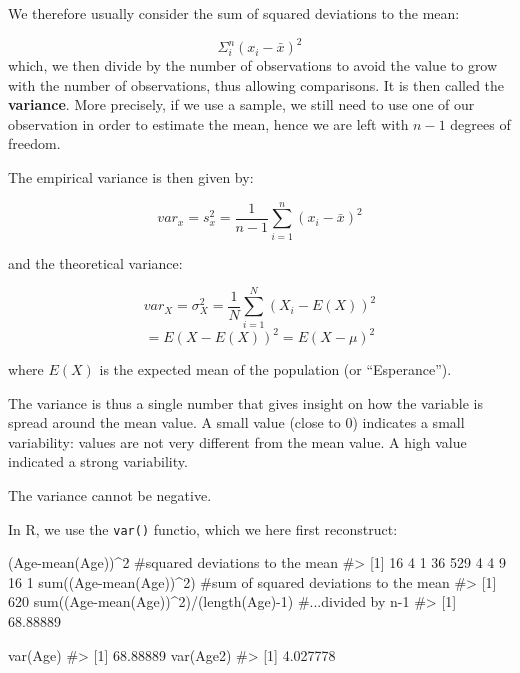 \documentclass[
  letterpaper,
  DIV=11,
  numbers=noendperiod]{scrreprt}
\newenvironment{Shaded}{\begin{snugshade}}{\end{snugshade}}
\newcommand{\CommentTok}[1]{\textcolor[rgb]{0.37,0.37,0.37}{#1}}
\newcommand{\DecValTok}[1]{\textcolor[rgb]{0.68,0.00,0.00}{#1}}
\newcommand{\FunctionTok}[1]{\textcolor[rgb]{0.28,0.35,0.67}{#1}}
\newcommand{\NormalTok}[1]{\textcolor[rgb]{0.00,0.23,0.31}{#1}}
\newcommand{\SpecialCharTok}[1]{\textcolor[rgb]{0.37,0.37,0.37}{#1}}
\begin{document}
We therefore usually consider the sum of squared deviations to the mean:

\[\Sigma_i^n(x_i-\bar{x})^2\] which, we then divide by the number of
observations to avoid the value to grow with the number of observations,
thus allowing comparisons. It is then called the \textbf{variance}. More
precisely, if we use a sample, we still need to use one of our
observation in order to estimate the mean, hence we are left with
\(n-1\) degrees of freedom.

The empirical variance is then given by:

\[var_x = s^2_x = \dfrac{1}{n-1} \sum_{i=1}^n (x_i-\bar{x})^2\]

and the theoretical variance:

\[var_X = \sigma^2_X = \dfrac{1}{N} \sum_{i=1}^N (X_i-E(X))^2\]
\[= E(X-E(X))^2 = E(X-\mu)^2 \]

where \(E(X)\) is the expected mean of the population (or
``Esperance'').

The variance is thus a single number that gives insight on how the
variable is spread around the mean value. A small value (close to 0)
indicates a small variability: values are not very different from the
mean value. A high value indicated a strong variability.

The variance cannot be negative.

In R, we use the \texttt{var()} functio, which we here first
reconstruct:

\begin{Shaded}
\begin{Highlighting}[]
\NormalTok{(Age}\SpecialCharTok{{-}}\FunctionTok{mean}\NormalTok{(Age))}\SpecialCharTok{\^{}}\DecValTok{2} \CommentTok{\#squared deviations to the mean}
\CommentTok{\#\textgreater{}  [1]  16   4   1  36 529   4   4   9  16   1}
\FunctionTok{sum}\NormalTok{((Age}\SpecialCharTok{{-}}\FunctionTok{mean}\NormalTok{(Age))}\SpecialCharTok{\^{}}\DecValTok{2}\NormalTok{) }\CommentTok{\#sum of squared deviations to the mean}
\CommentTok{\#\textgreater{} [1] 620}
\FunctionTok{sum}\NormalTok{((Age}\SpecialCharTok{{-}}\FunctionTok{mean}\NormalTok{(Age))}\SpecialCharTok{\^{}}\DecValTok{2}\NormalTok{)}\SpecialCharTok{/}\NormalTok{(}\FunctionTok{length}\NormalTok{(Age)}\SpecialCharTok{{-}}\DecValTok{1}\NormalTok{) }\CommentTok{\#...divided by n{-}1}
\CommentTok{\#\textgreater{} [1] 68.88889}

\FunctionTok{var}\NormalTok{(Age)}
\CommentTok{\#\textgreater{} [1] 68.88889}
\FunctionTok{var}\NormalTok{(Age2)}
\CommentTok{\#\textgreater{} [1] 4.027778}
\end{Highlighting}
\end{Shaded}
\end{document}
